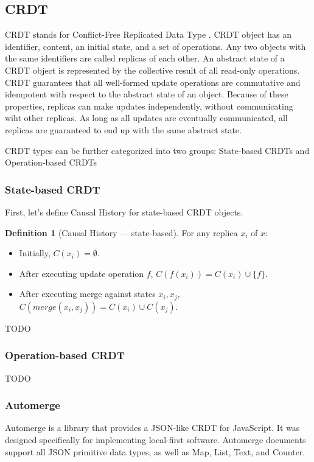 \documentclass[a4paper, 11pt, oneside]{article}
\theoremstyle{definition}
\newtheorem{definition}{Definition}[section]
\begin{document}
\subsection{CRDT}
CRDT stands for Conflict-Free Replicated Data Type \cite{crdt}. CRDT object has an identifier, content, an initial state, and a set of operations. Any two objects with the same identifiers are called replicas of each other. An abstract state of a CRDT object is represented by the collective result of all read-only operations. CRDT guarantees that all well-formed update operations are commutative and idempotent with respect to the abstract state of an object. Because of these properties, replicas can make updates independently, without communicating wiht other replicas. As long as all updates are eventually communicated, all replicas are guaranteed to end up with the same abstract state.

CRDT types can be further categorized into two groups:  State-based CRDTs and Operation-based CRDTs

\subsubsection{State-based CRDT}
First, let's define Causal History for state-based CRDT objects.

\begin{definition}[Causal History — state-based]
    For any replica $x_i$ of $x$:
\begin{itemize}
    \item Initially, $C(x_i) = \emptyset$.
    \item After executing update operation $f$, $C(f(x_i)) = C(x_i) \cup \{f\}$.
    \item After executing merge against states $x_i, x_j$, $C(merge(x_i, x_j)) = C(x_i) \cup C(x_j)$.
\end{itemize}
\end{definition}
TODO

\subsubsection{Operation-based CRDT}
TODO

\subsubsection{Automerge}
Automerge \cite{automerge} is a library that provides a JSON-like CRDT for JavaScript. It was designed specifically for implementing local-first software. Automerge documents support all JSON primitive data types, as well as Map, List, Text, and Counter. 
\end{document}
